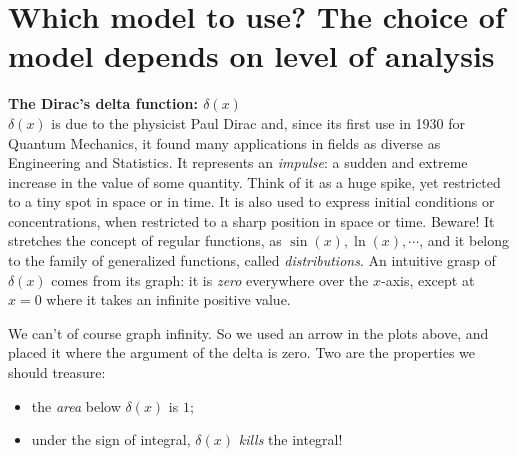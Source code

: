 \section{Which model to use? The choice of model depends on level of analysis}

\newpage
\begin{svgraybox}
	{\bf{The Dirac's delta function: \(\delta(x)\)}}
	\\

	\(\delta(x)\) is due to the physicist Paul Dirac and, since its first use in 1930 for Quantum Mechanics, it found many applications in fields as diverse as Engineering and Statistics. It represents an \textit{impulse}: a sudden and extreme increase in the value of some quantity. Think of it as a huge spike, yet restricted to a tiny spot in space or in time. It is also used to express initial conditions or concentrations, when restricted to a sharp position in space or time. Beware! It stretches the concept of regular functions, as \(\sin(x), \ln(x), \cdots \), and it belong to the family of generalized  functions, called \textit{distributions}. An intuitive grasp of \(\delta(x)\) comes from its graph: it is \textit{zero} everywhere over the \(x\)-axis, except at \(x =0\) where it takes an infinite positive value.

  
	We can't of course graph infinity. So we used an arrow in the plots above, and placed it where the argument of the delta is zero. Two are the properties we should treasure: 
	\begin{itemize}
		\item the \textit{area} below \(\delta(x)\) is \(1\); 
		\item under the sign of integral, \(\delta(x)\) \textit{kills} the integral! 
	\end{itemize}	
	

\end{svgraybox}
